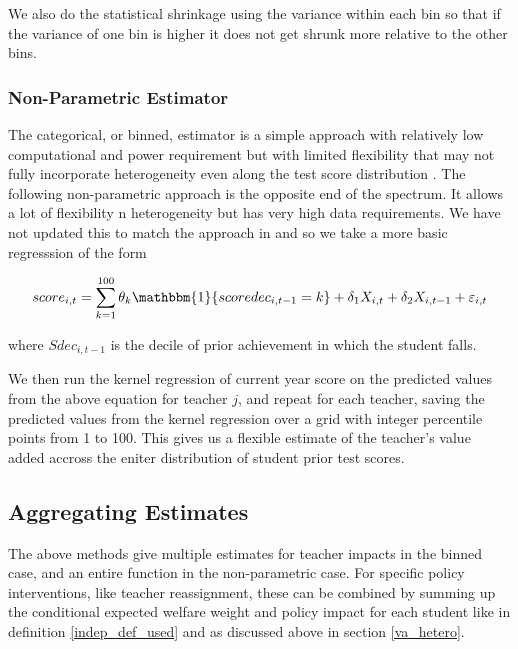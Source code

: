 \documentclass[12pt]{article}
\theoremstyle{definition}
\theoremstyle{definition}
\theoremstyle{definition}
\theoremstyle{definition}
\begin{document}
    We also do the statistical shrinkage using the variance within each bin so that if the variance of one bin is higher it does not get shrunk more relative to the other bins. 

    \subsubsection{Non-Parametric Estimator}
    The categorical, or binned, estimator is a simple approach with relatively low computational and power requirement but with limited flexibility that may not fully incorporate heterogeneity even along the test score distribution . The following non-parametric approach is the opposite end of the spectrum. It allows a lot of flexibility n heterogeneity but has very high data requirements. We have not updated this to match the approach in \citet{chetty2014measuring1} and so we take a more basic regresssion of the form
    
    \begin{align*}
        score_{i,t} = \sum_{k=1}^{100} \theta_k \mathbbm{1}\{scoredec_{i, t-1} = k\} + \delta_1 X_{i, t} + \delta_2 X_{i, t-1} + \varepsilon_{i, t}
    \end{align*}
        
    \noindent where $Sdec_{i, t-1}$ is the decile of prior achievement in which the student falls. 
    
      We then run the kernel regression of current year score on the predicted values from the above equation for teacher $j$, and repeat for each teacher, saving the predicted values from the kernel regression over a grid with integer percentile points from 1 to 100. This gives us a flexible estimate of the teacher's value added accross the eniter distribution of student prior test scores.
    
        \subsection{Aggregating Estimates}
        The above methods give multiple estimates for teacher impacts in the binned case, and an entire function in the non-parametric case. For specific policy interventions, like teacher reassignment, these can be combined by summing up the conditional expected welfare weight and policy impact for each student like in definition \ref{indep_def_used} and as discussed above in section \ref{va_hetero}. 
\end{document}
